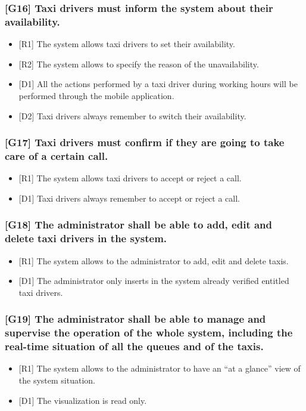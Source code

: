 \documentclass[a4paper,11pt]{report} %
\begin{document}
	\subsubsection{{[}G16{]} Taxi drivers must inform the system about their availability.}
	\begin{itemize}
		\item {[}R1{]} The system allows taxi drivers to set their availability.
		\item {[}R2{]} The system allows to specify the reason of the unavailability.
		\item {[}D1{]} All the actions performed by a taxi driver during working hours will be performed through the mobile application.
		\item {[}D2{]} Taxi drivers always remember to switch their availability.
	\end{itemize}
	
	\subsubsection{{[}G17{]} Taxi drivers must confirm if they are going to take care of a certain call.}
	\begin{itemize}
		\item {[}R1{]} The system allows taxi drivers to accept or reject a call.
		\item {[}D1{]} Taxi drivers always remember to accept or reject a call.
	\end{itemize}	
					
	\subsubsection{{[}G18{]} The administrator shall be able to add, edit and delete taxi drivers in the system.}
	\begin{itemize}
		\item {[}R1{]} The system allows to the administrator to add, edit and delete taxis.
		\item {[}D1{]} The administrator only inserts in the system already verified entitled taxi drivers.
	\end{itemize}	
	
	\subsubsection{{[}G19{]} The administrator shall be able to manage and supervise the operation of the whole system, including the real-time situation of all the queues and of the taxis.}
	\begin{itemize}
		\item {[}R1{]} The system allows to the administrator to have an ``at a glance'' view of the system situation.
		\item {[}D1{]} The visualization is read only.
	\end{itemize}							
		
\end{document}

